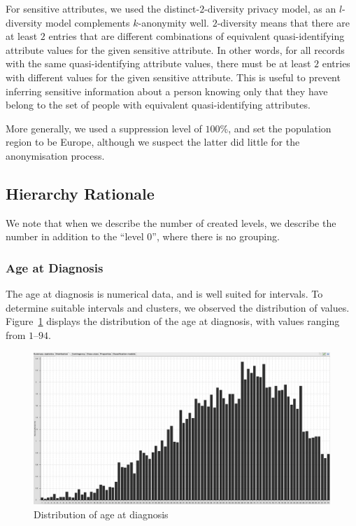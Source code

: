 \documentclass[parskip=half]{scrartcl}
\newcommand\figref{Figure~\ref}
\begin{document}
For sensitive attributes, we used the distinct-$2$-diversity privacy model, as
an $l$-diversity model complements $k$-anonymity well. $2$-diversity means that
there are at least $2$ entries that are different combinations of equivalent
quasi-identifying attribute values for the given sensitive attribute. In other
words, for all records with the same quasi-identifying attribute values, there
must be at least $2$ entries with different values for the given sensitive
attribute. This is useful to prevent inferring sensitive information about a
person knowing only that they have belong to the set of people with equivalent
quasi-identifying attributes.

More generally, we used a suppression level of $100$\%, and set the population
region to be Europe, although we suspect the latter did little for the
anonymisation process.

\subsection{Hierarchy Rationale}

We note that when we describe the number of created levels, we describe the
number in addition to the ``level $0$'', where there is no grouping.

\subsubsection{Age at Diagnosis}

The age at diagnosis is numerical data, and is well suited for intervals. To
determine suitable intervals and clusters, we observed the distribution of
values. \figref{fig:age-distribution} displays the distribution of the age at
diagnosis, with values ranging from $1$--$94$.

\begin{figure}[ht]
    \begin{center}
        \includegraphics[width=\textwidth]{age_distribution}
        \caption{Distribution of age at diagnosis}
        \label{fig:age-distribution}
    \end{center}
\end{figure}
\end{document}
